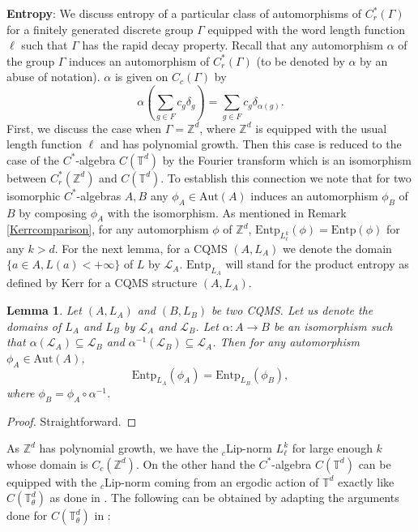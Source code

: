 \documentclass[a4paper,11pt,reqno]{amsart}
\theoremstyle{plain}
\newtheorem{lem}[thm]{Lemma}
\theoremstyle{mainthmstyle}
\theoremstyle{named}
\numberwithin{equation}{section}
\begin{document}
{\bf Entropy}:  We discuss entropy of a particular class of automorphisms of $C^{\ast}_{r}(\Gamma)$ for a finitely generated discrete group $\Gamma$ equipped with the word length function $\ell$ such that $\Gamma$ has the rapid decay property. Recall that any automorphism $\alpha$ of the group $\Gamma$ induces an automorphism of $C^{\ast}_{r}(\Gamma)$ (to be denoted by $\alpha$ by an abuse of notation). $\alpha$ is given on $C_{c}(\Gamma)$ by
\begin{displaymath}
    \alpha \left (\sum_{g\in F}c_{g}\delta_{g} \right )=\sum_{g\in F}c_{g}\delta_{\alpha(g)}.
\end{displaymath}
First, we discuss the case when $\Gamma=\mathbb{Z}^d$, where $\mathbb{Z}^d$ is equipped with the usual length function $\ell$ and has polynomial growth. Then this case is reduced to the case of the $C^{\ast}$-algebra $C(\mathbb{T}^d)$ by the Fourier transform which is an isomorphism between $C^{\ast}_{r}(\mathbb{Z}^d)$ and $C(\mathbb{T}^d)$. To establish this connection we note that for two isomorphic $C^{\ast}$-algebras $A,B$ any $\phi_{A}\in\textrm{Aut}(A)$ induces an automorphism $\phi_{B}$ of $B$ by composing $\phi_{A}$ with the isomorphism. As mentioned in Remark \ref{Kerrcomparison}, for any automorphism $\phi$ of $\mathbb{Z}^d$, $\mathrm{Entp}_{L^{k}_{\ell}}(\phi)=\mathrm{Entp}(\phi)$ for any $k>d$. For the next lemma, for a CQMS $(A,L_A)$ we denote the domain $\{a\in A, L(a)<+\infty\}$ of $L$ by $\mathcal{L}_{A}$. $\mathrm{Entp}_{L_{A}}$ will stand for the product entropy as defined by Kerr for a CQMS structure $(A,L_{A})$. 
\begin{lem}\label{abeliancase}
    Let $(A,L_{A})$ and $(B,L_{B})$ be two CQMS. Let us denote the domains of $L_{A}$ and $L_{B}$ by $\mathcal{L}_{A}$ and $\mathcal{L}_{B}$. Let $\alpha:A\rightarrow B$ be an isomorphism such that $\alpha(\mathcal{L}_{A})\subseteq\mathcal{L}_{B}$ and $\alpha^{-1}(\mathcal{L}_{B})\subseteq\mathcal{L}_{A}$. Then for any automorphism $\phi_{A}\in\textrm{Aut}(A)$, 
    \begin{displaymath}
        \mathrm{Entp}_{L_{A}}(\phi_{A})=\mathrm{Entp}_{L_{B}}(\phi_{B}),
    \end{displaymath}
    where $\phi_{B}=\phi_{A}\circ\alpha^{-1}$.
\end{lem}
\begin{proof}
    Straightforward.
\end{proof}
As $\mathbb{Z}^d$ has polynomial growth, we have the ${}_c$Lip-norm $L^{k}_{\ell}$ for large enough $k$ whose domain is $C_{c}(\mathbb{Z}^d)$. On the other hand the $C^{\ast}$-algebra $C(\mathbb{T}^d)$ can be equipped with the ${}_c$Lip-norm coming from an ergodic action of $\mathbb{T}^{d}$ exactly like $C(\mathbb{T}^{d}_{\theta})$ as done in \cite{Kerr}. The following can be obtained by adapting the arguments done for $C(\mathbb{T}^{d}_{\theta})$ in \cite{Kerr}:
\end{document}

